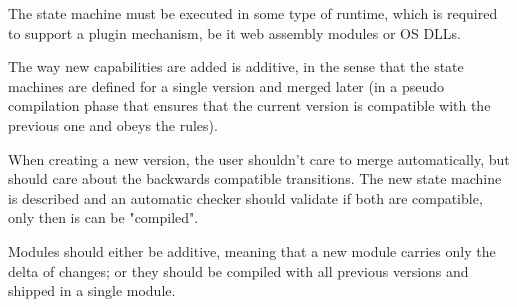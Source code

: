 \documentclass[a4paper]{article}
\begin{document}
The state machine must be executed in some type of runtime, which is required to support
a plugin mechanism, be it web assembly modules or OS DLLs.

The way new capabilities are added is additive, in the sense that the state machines are defined
for a single version and merged later (in a pseudo compilation phase that ensures that the current version
is compatible with the previous one and obeys the rules).

When creating a new version, the user shouldn't care to merge automatically, but should care about the
backwards compatible transitions.
The new state machine is described and an automatic checker should validate if both are
compatible, only then is can be "compiled".

Modules should either be additive, meaning that a new module carries only the delta of changes;
or they should be compiled with all previous versions and shipped in a single module.



\end{document}
